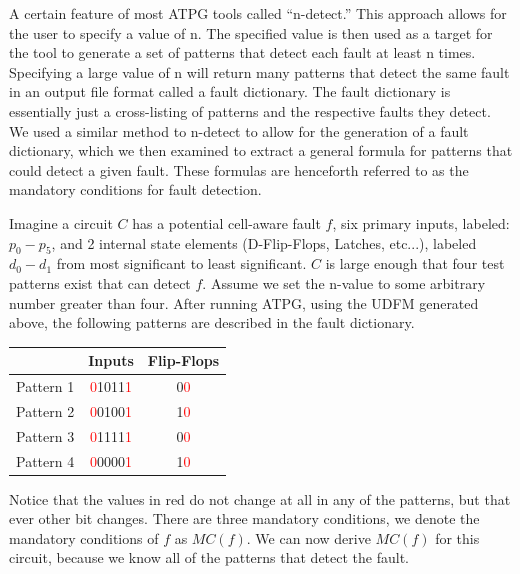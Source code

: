     A certain feature of most ATPG tools called ``n-detect.'' 
    This approach allows for the user to specify a value of n. 
    The specified value is then used as a target for the tool to generate a set of patterns that detect each fault at least n times.
    Specifying a large value of n will return many patterns that detect the same fault in an output file format called a fault dictionary. 
    The fault dictionary is essentially just a cross-listing of patterns and the respective faults they detect. 
    We used a similar method to n-detect to allow for the generation of a fault dictionary, which we then examined to extract a general formula for patterns that could detect a given fault. 
    These formulas are henceforth referred to as the mandatory conditions for fault detection. 


    Imagine a circuit $C$ has a potential cell-aware fault $f$, six primary inputs, labeled: $p_{0}-p_{5}$, and 2 internal state elements (D-Flip-Flops, Latches, etc...), labeled $d_{0}-d_{1}$ from most significant to least significant.
    $C$ is large enough that four test patterns exist that can detect $f$. 
    Assume we set the n-value to some arbitrary number greater than four. 
    After running ATPG, using the UDFM generated above, the following patterns are described in the fault dictionary. 


    \begin{center}
    \begin{tabular}{| c | c | c |}
        \hline
        & Inputs & Flip-Flops\\
        \hline
        \hline
        Pattern 1 & \textcolor{red}{0}1011\textcolor{red}{1} & 0\textcolor{red}{0} \\
        \hline
        Pattern 2 & \textcolor{red}{0}0100\textcolor{red}{1} & 1\textcolor{red}{0} \\
        \hline
        Pattern 3 & \textcolor{red}{0}1111\textcolor{red}{1} & 0\textcolor{red}{0} \\
        \hline
        Pattern 4 & \textcolor{red}{0}0000\textcolor{red}{1} & 1\textcolor{red}{0} \\
        \hline
    \end{tabular}
    \end{center}

    Notice that the values in red do not change at all in any of the patterns, but that ever other bit changes. 
    There are three mandatory conditions, we denote the mandatory conditions of $f$ as $MC(f)$.
    We can now derive $MC(f)$ for this circuit, because we know all of the patterns that detect the fault. 
   
